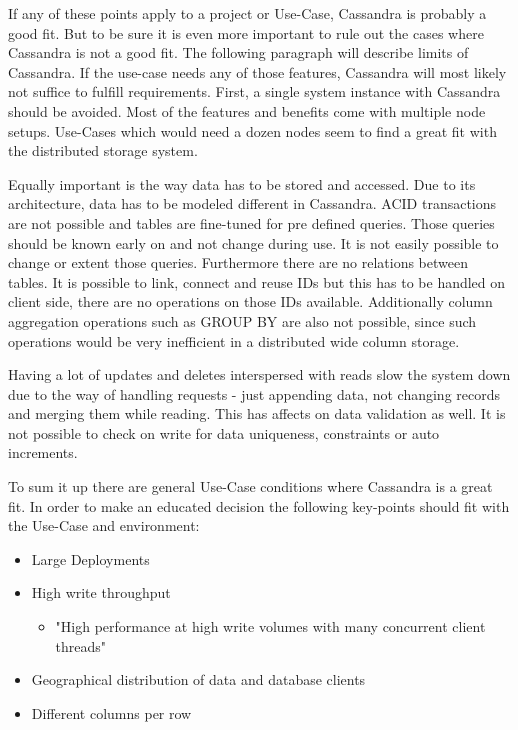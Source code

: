 If any of these points apply to a project or Use-Case, Cassandra is probably a good fit.
But to be sure it is even more important to rule out the cases where Cassandra is not a good fit.
The following paragraph will describe limits of Cassandra. If the use-case needs any of those features, Cassandra will most likely not suffice to fulfill requirements.
First, a single system instance with Cassandra should be avoided. Most of the features and benefits come with multiple node setups. Use-Cases which would need a dozen nodes seem to find a great fit with the distributed storage system.

Equally important is the way data has to be stored and accessed. Due to its architecture, data has to be modeled different in Cassandra. ACID transactions are not possible and tables are fine-tuned for pre defined queries. Those queries should be known early on and not change during use. It is not easily possible to change or extent those queries. Furthermore there are no relations between tables. It is possible to link, connect and reuse IDs but this has to be handled on client side, there are no operations on those IDs available. Additionally column aggregation operations such as GROUP BY are also not possible, since such operations would be very inefficient in a distributed wide column storage.

Having a lot of updates and deletes interspersed with reads slow the system down due to the way of handling requests - just appending data, not changing records and merging them while reading. This has affects on data validation as well. It is not possible to check on write for data uniqueness, constraints or auto increments. \autocite{cassandra_oreilly}

To sum it up there are general Use-Case conditions where Cassandra is a great fit.
In order to make an educated decision the following key-points should fit with the Use-Case and environment:

\begin{itemize}
    \item Large Deployments
    \item High write throughput
    \begin{itemize}
      \item{"High performance at high write volumes with many concurrent client threads"} \autocite{cassandra_oreilly}
    \end{itemize}
    \item Geographical distribution of data and database clients
    \item Different columns per row
\end{itemize}


